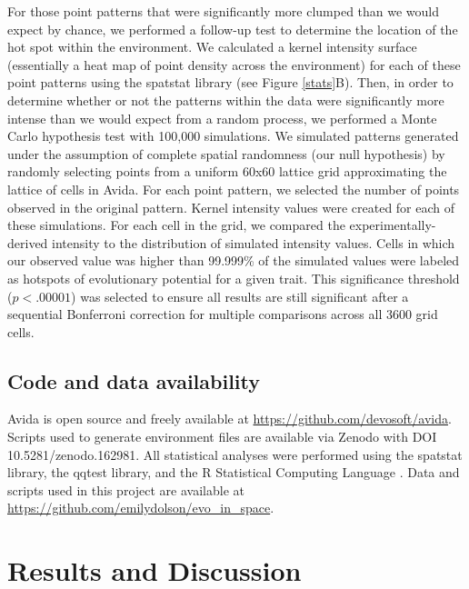 For those point patterns that were significantly more clumped than we would expect by chance, we performed a follow-up test to determine the location of the hot spot within the environment. We calculated a kernel intensity surface (essentially a heat map of point density across the environment) for each of these point patterns using the spatstat library \citep{baddeley_spatial_2015} (see Figure \ref{stats}B). Then, in order to determine whether or not the patterns within the data were significantly more intense than we would expect from a random process, we performed a Monte Carlo hypothesis test with 100,000 simulations. We simulated patterns generated under the assumption of complete spatial randomness (our null hypothesis) by randomly selecting points from a uniform 60x60 lattice grid approximating the lattice of cells in Avida.  For each point pattern, we selected the number of points observed in the original pattern. Kernel intensity values were created for each of these simulations. For each cell in the grid, we compared the experimentally-derived intensity to the distribution of simulated intensity values. Cells in which our observed value was higher than 99.999\% of the simulated values were labeled as hotspots of evolutionary potential for a given trait. This significance threshold ($p < .00001$) was selected to ensure all results are still significant after a sequential Bonferroni correction for multiple comparisons across all 3600 grid cells.

\subsection{Code and data availability}
Avida is open source and freely available at \href{https://github.com/devosoft/avida}{https://github.com/devosoft/avida}. Scripts used to generate environment files are available via Zenodo with DOI 10.5281/zenodo.162981. All statistical analyses were performed using the spatstat library, the qqtest library, and the R Statistical Computing Language \citep{baddeley_spatial_2015,oldford_qqtest:_2016,r_core_development_team_r:_2013}. Data and scripts used in this project are available at \href{https://github.com/emilydolson/evo_in_space}{https://github.com/emilydolson/evo\_in\_space}.

\section{Results and Discussion}
